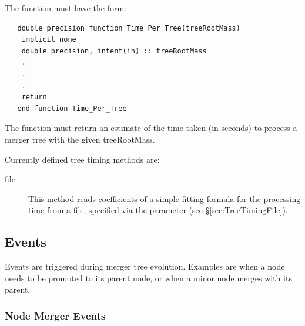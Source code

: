 The function must have the form:
\begin{verbatim}
   double precision function Time_Per_Tree(treeRootMass)
    implicit none
    double precision, intent(in) :: treeRootMass
    .
    .
    .
    return
   end function Time_Per_Tree 
\end{verbatim}
The function must return an estimate of the time taken (in seconds) to process a merger tree with the given {\normalfont \ttfamily treeRootMass}.

Currently defined tree timing methods are:
\begin{description}
 \item [{\normalfont \ttfamily file}] This method reads coefficients of a simple fitting formula for the processing time from a file, specified via the {\normalfont \ttfamily [timePerTreeFitFileName]} parameter (see \S\ref{sec:TreeTimingFile}).
\end{description}

\subsection{Events}

Events are triggered during merger tree evolution. Examples are when a node needs to be promoted to its parent node, or when a minor node merges with its parent.

\subsubsection{Node Merger Events}


